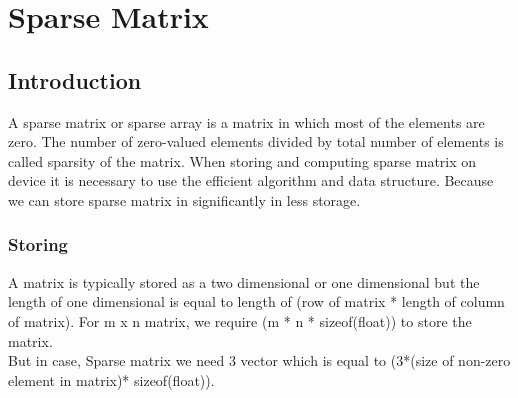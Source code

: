 \chapter{Sparse Matrix}

\section{Introduction}
A sparse matrix or sparse array is a matrix in which most of the elements are zero. The number  of zero-valued elements divided by total number of elements is called sparsity of the matrix. When storing and computing sparse matrix on device it is necessary to use the efficient algorithm and data structure. Because we can store sparse matrix in significantly in less storage.
\subsection{Storing}
A matrix is typically stored as a two dimensional or one dimensional but the length of one dimensional is equal to length of (row of matrix * length of column of matrix). For m x n matrix, we require (m * n * sizeof(float)) to store the matrix.\\
But in case, Sparse matrix we need 3 vector which is equal to (3*(size of non-zero element in matrix)* sizeof(float)).
